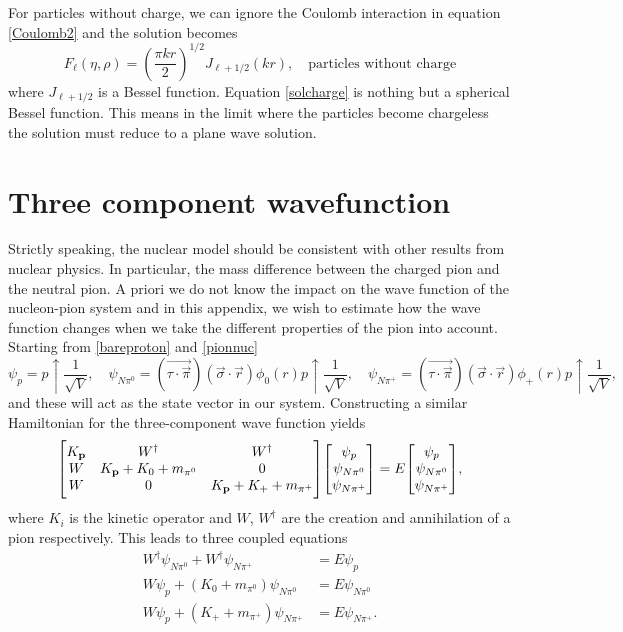 For particles without charge, we can ignore the Coulomb interaction in equation \eqref{Coulomb2} and the solution becomes
\begin{equation} \label{solcharge}
	F_\ell(\eta,\rho) = \left( \frac{\pi kr}{2} \right)^{1/2} J_{\ell+1/2}(kr), \quad \text{particles without charge}
\end{equation}
where $J_{\ell+1/2}$ is a Bessel function. Equation \eqref{solcharge} is nothing but a spherical Bessel function. This means in the limit where the particles become chargeless the solution must reduce to a plane wave solution. 

\chapter{Three component wavefunction}\label{ThreeComponentWavefunction}
Strictly speaking, the nuclear model should be consistent with other results from nuclear physics. In particular, the mass difference between the charged pion and the neutral pion. A priori we do not know the impact on the wave function of the nucleon-pion system and in this appendix, we wish to estimate how the wave function changes when we take the different properties of the pion into account. Starting from \eqref{bareproton} and \eqref{pionnuc}
\begin{equation}\label{pnpipi}
	\psi_p = p\uparrow\frac{1}{\sqrt{V}}, \quad \psi_{N\pi^0}=(\vec{\tau\cdot\vec{\pi}})(\vec{\sigma}\cdot\vec{r})\phi_0(r) p\uparrow\frac{1}{\sqrt{V}}, \quad \psi_{N\pi^+}=(\vec{\tau\cdot\vec{\pi}})(\vec{\sigma}\cdot\vec{r})\phi_+(r) p\uparrow\frac{1}{\sqrt{V}},
\end{equation}
and these will act as the state vector in our system. Constructing a similar Hamiltonian for the three-component wave function yields
\begin{equation}
	\mqty[K_{\vec{p}} & W^\dagger & W^\dagger \\ W & K_{\vec{p}}+K_0+m_{\pi^0} & 0 \\ W & 0 & K_{\vec{p}}+K_{+}+m_{\pi^+}]\mqty[\psi_p \\ \psi_{N\pi^0} \\ \psi_{N\pi^+}] = E \mqty[\psi_p \\ \psi_{N\pi^0} \\ \psi_{N\pi^+}],
\end{equation}
where $K_i$ is the kinetic operator and $W$, $W^\dagger$ are the creation and annihilation of a pion respectively. This leads to three coupled equations 
\begin{align}
	W^\dagger \psi_{N\pi^0}+W^\dagger \psi_{N\pi^+} & = E\psi_p \\    
	W\psi_p + (K_0+m_{\pi^0})\psi_{N\pi^0} &=E\psi_{N\pi^0} \\
	W\psi_p + (K_{+}+m_{\pi^+})\psi_{N\pi^+}  & =E\psi_{N\pi^+}. 
\end{align}
